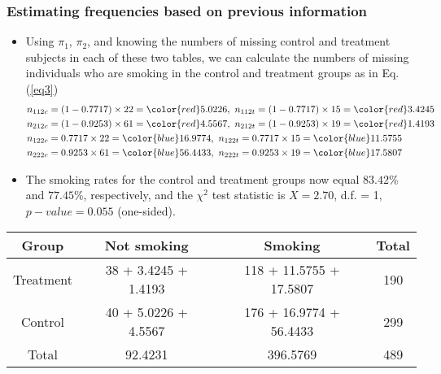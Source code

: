 \documentclass{beamer}
\begin{document}
\begin{frame}
\frametitle{Estimating frequencies based on previous information}
\begin{itemize}
\item Using $\pi_1$, $\pi_2$, and knowing the numbers of missing control and treatment subjects in each of these two tables, we can calculate the numbers of missing individuals who are smoking in the control and treatment groups as in Eq. (\ref{eq3})
\begin{align}\label{eq3}
n_{112c} & = (1 - 0.7717)\times 22 = {\color{red}5.0226},~n_{112t} = (1 - 0.7717)\times 15 = {\color{red}3.4245} \\
n_{212c} & = (1 - 0.9253)\times 61 = {\color{red}4.5567},~n_{212t} = (1 - 0.9253)\times 19 = {\color{red}1.4193} \nonumber\\
n_{122c} & = 0.7717\times 22 = {\color{blue}16.9774},~n_{122t} = 0.7717\times 15 = {\color{blue}11.5755} \nonumber\\
n_{222c} & = 0.9253\times 61 = {\color{blue}56.4433},~n_{222t} = 0.9253\times 19 = {\color{blue}17.5807} \nonumber
\end{align}
\item The smoking rates for the control and treatment groups now equal $83.42\%$ and $77.45\%$, respectively, and
the $\chi^2$ test statistic is $X = 2.70$, d.f. = 1, $p-value = 0.055$ (one-sided).
\end{itemize}
\centering
\begin{tabular}{c|ccc}\hline
Group & Not smoking & Smoking & Total \\\hline
Treatment & 38 + {\color{red}3.4245} + {\color{red}1.4193} & 118 + {\color{blue}11.5755} + {\color{blue}17.5807} & 190 \\
Control & 40 + {\color{red}5.0226} + {\color{red}4.5567} & 176 + {\color{blue}16.9774} + {\color{blue}56.4433} & 299 \\\hline
Total  & 92.4231 & 396.5769 & 489\\\hline
\end{tabular}
\end{frame}
\end{document}
